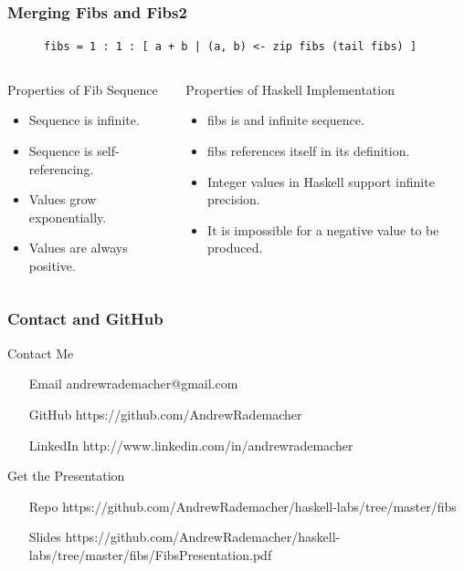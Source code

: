 \documentclass{beamer}
\begin{document}
    \begin{frame}[fragile=singleslide]
        \frametitle{Merging Fibs and Fibs2}

        \begin{figure}
            \begin{lstlisting}
fibs = 1 : 1 : [ a + b | (a, b) <- zip fibs (tail fibs) ]
            \end{lstlisting}
        \end{figure}

        \begin{columns}[c]
            \begin{column}[T]{5cm}
                Properties of Fib Sequence
                \begin{itemize}
                    \item Sequence is infinite.
                    \item Sequence is self-referencing.
                    \item Values grow exponentially.
                    \item Values are always positive.
                \end{itemize}
            \end{column}
            \begin{column}[T]{5cm}
                Properties of Haskell Implementation
                \begin{itemize}
                    \item fibs is and infinite sequence.
                    \item fibs references itself in its definition.
                    \item Integer values in Haskell support infinite precision.
                    \item It is impossible for a negative value to be produced.
                \end{itemize}
            \end{column}
        \end{columns}
    \end{frame}

	\begin{frame}[fragile=singleslide]
		\frametitle{Contact and GitHub}
		
		Contact Me
		\begin{itemize}
			\item[Email] andrewrademacher@gmail.com
			\item[GitHub] https://github.com/AndrewRademacher
			\item[LinkedIn] http://www.linkedin.com/in/andrewrademacher
		\end{itemize}
		
		Get the Presentation
		\begin{itemize}
			\item[Repo] https://github.com/AndrewRademacher/haskell-labs/tree/master/fibs
			\item[Slides] https://github.com/AndrewRademacher/haskell-labs/tree/master/fibs/FibsPresentation.pdf
		\end{itemize}
	\end{frame}
\end{document}
